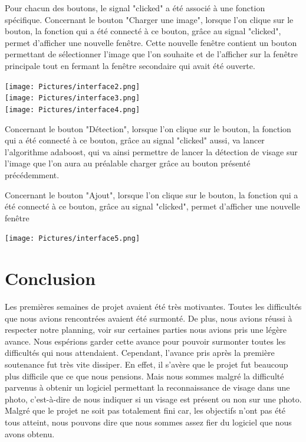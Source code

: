 \documentclass[12pt,a4paper]{article}
\begin{document}
Pour chacun des boutons, le signal "clicked" a été associé à une fonction spécifique.
Concernant le bouton "Charger une image", lorsque l'on clique sur le bouton, la fonction qui a été connecté à ce bouton, grâce au signal "clicked", permet d'afficher une nouvelle fenêtre. Cette nouvelle fenêtre contient un bouton permettant de sélectionner l'image que l'on souhaite et de l'afficher sur la fenêtre principale tout en fermant la fenêtre secondaire qui avait été ouverte.
\begin{center}
\texttt{[image: Pictures/interface2.png]} \\
\texttt{[image: Pictures/interface3.png]} \\
\texttt{[image: Pictures/interface4.png]} \\

\end{center}

Concernant le bouton "Détection", lorsque l'on clique sur le bouton, la fonction qui a été connecté à ce bouton, grâce au signal "clicked" aussi, va lancer l'algorithme adaboost, qui va ainsi permettre de lancer la détection de visage sur l'image que l'on aura au préalable charger grâce au bouton présenté précédemment.

Concernant le bouton "Ajout", lorsque l'on clique sur le bouton, la fonction qui a été connecté à ce bouton, grâce au signal "clicked", permet d'afficher une nouvelle fenêtre \\
\begin{center}
\texttt{[image: Pictures/interface5.png]} 
\end{center}


\newpage
\section{Conclusion}
Les premières semaines de projet avaient été très motivantes. Toutes les difficultés que nous avions rencontrées avaient été surmonté. De plus, nous avions réussi à respecter notre planning, voir sur certaines parties nous avions pris une légère avance. Nous espérions garder cette avance pour pouvoir surmonter toutes les difficultés qui nous attendaient. Cependant, l'avance pris après la première soutenance fut très vite dissiper. En effet, il s'avère que le projet fut beaucoup plus difficile que ce que nous pensions. Mais nous sommes malgré la difficulté parvenus à obtenir un logiciel permettant la reconnaissance de visage dans une photo, c'est-à-dire de nous indiquer si un visage est présent ou non sur une photo.
Malgré que le projet ne soit pas totalement fini car, les objectifs n'ont pas été tous atteint, nous pouvons dire que nous sommes assez fier du logiciel que nous avons obtenu.
\end{document}
